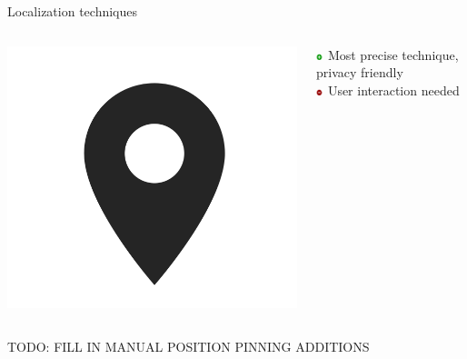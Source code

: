 \documentclass[11pt]{beamer}
\begin{document}
\begin{frame}{Localization techniques}

  \begin{columns}[c]

    \begin{column}{0.2\textwidth}
      \includegraphics[width=\textwidth]{location-symbol}
    \end{column}

    \hfill

    \begin{column}{0.8\textwidth}

      \includegraphics[width=0.05\textwidth]{plus} Most precise technique, privacy friendly\\
      \includegraphics[width=0.05\textwidth]{minus} User interaction needed

    \end{column}

  \end{columns}

  TODO: FILL IN MANUAL POSITION PINNING ADDITIONS

\end{frame}
\end{document}
